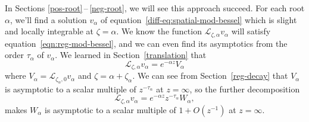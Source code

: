 \documentclass{article}
\theoremstyle{definition}
\newcommand{\fracderiv}[3]{\partial^{#1}_{#2, #3}}
\newcommand{\laplace}{\mathcal{L}}
\begin{document}
In Sections \ref{pos-root}\,--\,\ref{neg-root}, we will see this approach succeed. For each root $\alpha$, we'll find a solution $v_\alpha$ of equation~\eqref{diff-eq:spatial-mod-bessel} which is slight and locally integrable at $\zeta = \alpha$. We know the function $\laplace_{\zeta, \alpha} v_\alpha$ will satisfy equation~\eqref{eqn:reg-mod-bessel}, and we can even find its asymptotics from the order $\tau_\alpha$ of $v_\alpha$. We learned in Section~\ref{translation} that
\[ \laplace_{\zeta, \alpha} v_\alpha = e^{-\alpha z} V_\alpha \]
where $V_\alpha = \laplace_{\zeta_\alpha, 0} v_\alpha$ and $\zeta = \alpha + \zeta_\alpha$. We can see from Section~\ref{reg-decay} that $V_\alpha$ is asymptotic to a scalar multiple of $z^{ - \tau_\alpha}$ at $z = \infty$, so the further decomposition
\[ \laplace_{\zeta, \alpha} v_\alpha = e^{-\alpha z} z^{-\tau_\alpha} W_\alpha, \]
makes $W_\alpha$ is asymptotic to a scalar multiple of $1+O(z^{-1})$ at $z = \infty$.
\end{document}
